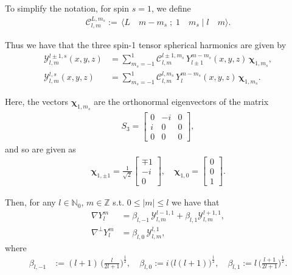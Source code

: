 \documentclass[11pt, oneside]{article}   	%
\newcommand{\sotodo}{\todo[color=green]}
\newcommand{\half}{\frac{1}{2}}
\newcommand{\Z}{\mathbb{Z}}
\newcommand{\No}{\mathbb{N}_0}
\newcommand{\Ylm}{Y^m_l}
\newcommand{\curlyy}{\bm{\mathcal{Y}}}
\newcommand{\blone}{\beta_{l, 1}}
\newcommand{\blzero}{\beta_{l, 0}}
\newcommand{\blmone}{\beta_{l, -1}}
\newcommand{\chivec}{\bm{\chi}_{1,m_s}}
\newcommand{\cgcoeff}{\mathcal{C}}
\begin{document}
To simplify the notation, for spin $s=1$, we define
\begin{align}
\cgcoeff^{L, m_s}_{l, m} := \, \langle L \quad m-m_s \; ; \; 1 \quad m_s \; | \; l \quad m \rangle.
\end{align}

Thus we have that the three spin-1 tensor spherical harmonics are given by
\begin{align}
\curlyy^{l \pm1,s}_{l,m}(x,y,z) &= \sum_{m_s=-1}^1 \cgcoeff^{l\pm1, m_s}_{l, m} \, Y^{m-m_s}_{l \pm 1} (x,y,z) \, \chivec, \\
\curlyy^{l,s}_{l,m}(x,y,z) &= \sum_{m_s=-1}^1 \cgcoeff^{l, m_s}_{l, m} \, Y^{m-m_s}_l (x,y,z) \, \chivec.
\end{align}

Here, the vectors \(\chivec\) are the orthonormal eigenvectors of the matrix  \sotodo{Fix}
\begin{align}
S_3 = \begin{bmatrix} 0 & -i & 0 \\ i & 0 & 0 \\ 0 & 0 & 0 \end{bmatrix},
\end{align}
and so are given as
\begin{align}
\bm{\chi}_{1, \pm 1} = \frac{1}{\sqrt{2}} \begin{bmatrix} \mp 1 \\ -i \\ 0 \end{bmatrix}, \quad \bm{\chi}_{1,0} = \begin{bmatrix} 0 \\ 0 \\ 1 \end{bmatrix}.
\end{align}

Then, for any \(l \in \No\), \(m \in \Z\) s.t. \(0 \le |m| \le l\) we have that
\begin{align}
\nabla \Ylm &= \blmone \, \curlyy^{l-1,1}_{l,m} + \blone \curlyy^{l+1,1}_{l,m}, \\
\nabla^\perp \Ylm &= \blzero \, \curlyy^{l,1}_{l,m},
\end{align}
where
\begin{align}
\blmone &:= (l+1) \, \Big(\frac{l}{2l+1}\Big)^\half, \quad
\blzero := i \, \big(l(l+1)\big)^\half, \quad
\blone := l \, \Big(\frac{l+1}{2l+1}\Big)^\half.
\end{align}






\end{document}
